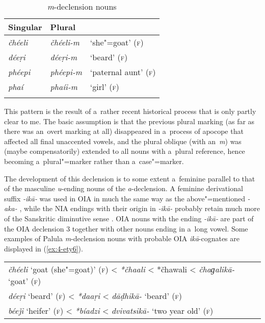 \begin{table}[ht]
\caption{\textit{m}-declension nouns}
\begin{tabularx}{.75\textwidth}{ Q Q l }
\lsptoprule
Singular &
Plural &
\\\midrule
\textit{čhéeli } &
\textit{čhéeli-m} &
`she"=goat' (\textsc{f})\\
\textit{déeṛi} &
\textit{déeṛi-m} &
`beard' (\textsc{f})\\
\textit{phéepi} &
\textit{phéepi-m} &
`paternal aunt' (\textsc{f})\\
\textit{phaí} &
\textit{phaíi-m} &
`girl' (\textsc{f})\\\lspbottomrule
\end{tabularx}
\label{tab:4-16}
\end{table}


This pattern is the result of a~rather recent historical process that is only partly clear to me. The basic assumption is that the previous plural marking (as far as there was an~overt marking at all) disappeared in a~process of apocope that affected all final unaccented vowels, and the plural oblique (with an~\textit{m}) was (maybe compensatorily) extended to all nouns with a~plural reference, hence becoming a~plural"=marker rather than a~case"=marker.


The development of this declension is to some extent a~feminine parallel to that of the masculine \textit{u}-ending nouns of the \textit{a}-declension. A feminine derivational suffix \textit{-ikā-} was used in OIA in much the same way as the above"=mentioned \textit{-aka-} \citep[1222]{whitney1960}, while the NIA endings with their origin in \textit{-ikā-} probably retain much more of the Sanskritic diminutive sense \citep[222]{masica1991}. OIA nouns with the ending \textit{-ikā-} are part of the OIA declension 3 together with other nouns ending in a~long vowel. Some examples of Palula \textit{m}-declension nouns with probable OIA \textit{ikā}-cognates are displayed in (\ref{ex:4-ety6}). 


\begin{exe}
\extab
\label{ex:4-ety6}
\begin{tabular}{ l }
\textit{čhéeli} `goat (she"=goat)' (\textsc{f}) {\textless} \textit{*čhaali} {\textless} *čhawali {\textless} \textit{čhaɡalikā-} `goat' (\textsc{f})\\
\textit{déeṛi} `beard' (\textsc{f}) {\textless} \textit{*daaṛi} {\textless} \textit{dāḍhikā-} `beard' (\textsc{f})\\
\textit{béeǰi} `heifer' (\textsc{f}) {\textless} \textit{*bíadzi} {\textless} \textit{dvivatsikā-} `two year old' (\textsc{f})
\end{tabular}
\end{exe}


